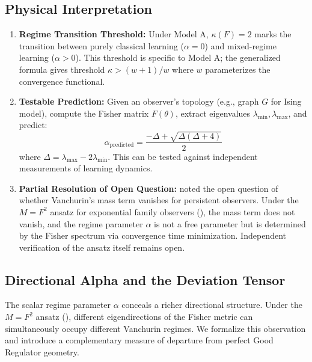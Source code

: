 \documentclass[11pt,a4paper]{article}
\theoremstyle{plain}
\theoremstyle{definition}
\theoremstyle{remark}
\begin{document}
\subsection{Physical Interpretation}

\begin{enumerate}[noitemsep]
\item \textbf{Regime Transition Threshold:} Under Model A, $\kappa(F) = 2$ marks the transition between purely classical learning ($\alpha = 0$) and mixed-regime learning ($\alpha > 0$). This threshold is specific to Model A; the generalized formula gives threshold $\kappa > (w+1)/w$ where $w$ parameterizes the convergence functional.

\item \textbf{Testable Prediction:} Given an observer's topology (e.g., graph $G$ for Ising model), compute the Fisher matrix $F(\theta)$, extract eigenvalues $\lambda_{\min}, \lambda_{\max}$, and predict:
\begin{equation}
\alpha_{\text{predicted}} = \frac{-\Delta + \sqrt{\Delta(\Delta + 4)}}{2}
\end{equation}
where $\Delta = \lambda_{\max} - 2\lambda_{\min}$. This can be tested against independent measurements of learning dynamics.

\item \textbf{Partial Resolution of Open Question:}  noted the open question of whether Vanchurin's mass term vanishes for persistent observers. Under the $M = F^2$ ansatz for exponential family observers (), the mass term does not vanish, and the regime parameter $\alpha$ is not a free parameter but is determined by the Fisher spectrum via convergence time minimization. Independent verification of the ansatz itself remains open.
\end{enumerate}

\subsection{Directional Alpha and the Deviation Tensor}
\label{sec:directional_alpha}

The scalar regime parameter $\alpha$ conceals a richer directional structure. Under the $M = F^2$ ansatz (), different eigendirections of the Fisher metric can simultaneously occupy different Vanchurin regimes. We formalize this observation and introduce a complementary measure of departure from perfect Good Regulator geometry.
\end{document}
